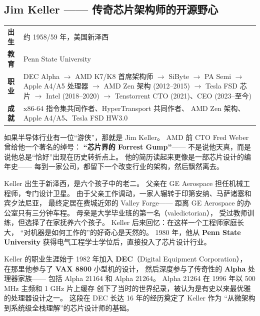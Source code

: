 \subsection{Jim Keller —— 传奇芯片架构师的开源野心}
\label{subsec:jim-keller}

\begin{keybox}
\small
\begin{tabularx}{\textwidth}{lX}
\toprule
\textbf{出生} & 约 1958/59 年，美国新泽西 \\
\textbf{教育} & Penn State University \\
\textbf{职业} & DEC Alpha $\to$ AMD K7/K8 首席架构师 $\to$
                SiByte $\to$ PA Semi $\to$
                Apple A4/A5 处理器 $\to$
                AMD Zen 架构 (2012--2015) $\to$
                Tesla FSD 芯片 $\to$
                Intel (2018--2020) $\to$
                Tenstorrent CTO (2021)、CEO (2023--至今) \\
\textbf{成就} & x86-64 指令集共同作者、HyperTransport 共同作者、
                AMD Zen 架构、Apple A4/A5、Tesla FSD HW3.0 \\
\bottomrule
\end{tabularx}
\end{keybox}

如果半导体行业有一位``游侠''，那就是 Jim Keller。
AMD 前 CTO Fred Weber 曾给他一个著名的绰号：
\textbf{``芯片界的 Forrest Gump''}——
不是说他天真，而是说他总是``恰好''出现在历史转折点上。
他的简历读起来更像是一部芯片设计的编年史——
每到一家公司，都留下一个改变行业的架构，然后飘然离去。

\begin{corebox}
Keller 出生于新泽西，是六个孩子中的老二。
父亲在 GE Aerospace 担任机械工程师，专门设计卫星。
由于父亲工作调动，一家人辗转于印第安纳、马萨诸塞和宾夕法尼亚，
最终定居在费城近郊的 Valley Forge——
距离 GE Aerospace 的办公室只有三分钟车程。
母亲是大学毕业班的第一名（valedictorian），
受过教师训练，但选择了在家抚养六个孩子。
Keller 后来回忆：在这样一个工程师家庭长大，
``对机器是如何工作的''的好奇心是天然的。
1980 年，他从 \textbf{Penn State University}
获得电气工程学士学位后，直接投入了芯片设计行业。
\end{corebox}

Keller 的职业生涯始于 1982 年加入 \textbf{DEC}（Digital Equipment Corporation），
在那里他参与了 \textbf{VAX 8800} 小型机的设计，
然后深度参与了传奇性的 \textbf{Alpha} 处理器家族——
包括 Alpha 21164 和 Alpha 21264。
Alpha 21264 在 1996 年以 500 MHz 主频和 1 GHz 片上缓存
创下了当时的世界纪录，被认为是有史以来最优雅的处理器设计之一。
这段在 DEC 长达 16 年的经历奠定了 Keller 作为
``从微架构到系统级全栈理解''的芯片设计师的基础。

